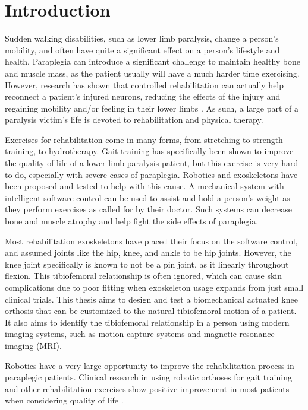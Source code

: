 \chapter{Introduction}
Sudden walking disabilities, such as lower limb paralysis, change a person's mobility, and often have quite a significant effect on a person's lifestyle and health. Paraplegia can introduce a significant challenge to maintain healthy bone and muscle mass, as the patient usually will have a much harder time exercising. However, research has shown that controlled rehabilitation can actually help reconnect a patient's injured neurons, reducing the effects of the injury and regaining mobility and/or feeling in their lower limbs \cite{GaitTrainingClinical}. As such, a large part of a paralysis victim's life is devoted to rehabilitation and physical therapy.

Exercises for rehabilitation come in many forms, from stretching to strength training, to hydrotherapy. Gait training has specifically been shown to improve the quality of life of a lower-limb paralysis patient, but this exercise is very hard to do, especially with severe cases of paraplegia. Robotics and exoskeletons have been proposed and tested to help with this cause. A mechanical system with intelligent software control can be used to assist and hold a person's weight as they perform exercises as called for by their doctor. Such systems can decrease bone and muscle atrophy and help fight the side effects of paraplegia. 

Most rehabilitation exoskeletons have placed their focus on the software control, and assumed joints like the hip, knee, and ankle to be hip joints. However, the knee joint specifically is known to not be a pin joint, as it linearly throughout flexion. This tibiofemoral relationship is often ignored, which can cause skin complications due to poor fitting when exoskeleton usage expands from just small clinical trials. This thesis aims to design and test a biomechanical actuated knee orthosis that can be customized to the natural tibiofemoral motion of a patient. It also aims to identify the tibiofemoral relationship in a person using modern imaging systems, such as motion capture systems and magnetic resonance imaging (MRI).

Robotics have a very large opportunity to improve the rehabilitation process in paraplegic patients. Clinical research in using robotic orthoses for gait training and other rehabilitation exercises show positive improvement in most patients when considering quality of life \cite{GaitTrainingBenefitsRoboticsWalkbot} \cite{RoboticGaitTraining}. 
